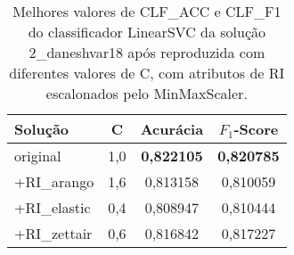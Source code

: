 \begin{table}[!thb]
    \centering
    \caption{Melhores valores de CLF\_ACC e CLF\_F1 do classificador LinearSVC da solução 2\_daneshvar18 após reproduzida com diferentes valores de C, com atributos de RI escalonados pelo MinMaxScaler.}
    \begin{adjustbox}{max width={\textwidth},keepaspectratio}%
    \begin{tabular}{|l|c|c|c|}
        \hline
        \textbf{Solução}
        & \textbf{C}
        & \textbf{Acurácia}
        & \textbf{$F_1$-Score}
        \\ \hline
        original        
        & 1,0   & \textbf{0,822105}   & \textbf{0,820785}
        \\ \hline
        +RI\_arango
        & 1,6   & 0,813158   & 0,810059          
        \\ \hline
        +RI\_elastic
        & 0,4   & 0,808947    & 0,810444
        \\ \hline
        +RI\_zettair
        & 0,6   & 0,816842	    & 0,817227
        \\ 
        \hline
    \end{tabular}
    \end{adjustbox}
    \\
    \label{tab:reprodução-2-daneshvar18-c} 
\end{table}
